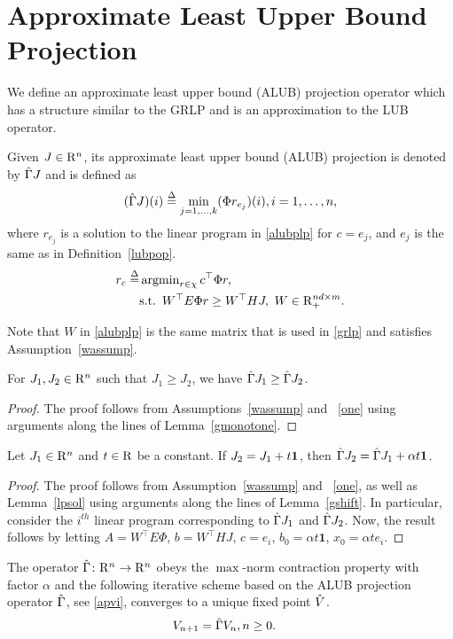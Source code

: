 \section{Approximate Least Upper Bound Projection}\label{sec:alubp}
We define an approximate least upper bound (ALUB) projection operator which has a structure similar to the GRLP and is an approximation to the LUB operator.
\begin{definition}\label{alubpop}
Given $J\in \mathrm{R}^n$, its approximate least upper bound (ALUB) projection is denoted by $\hat{\Gamma} J$ and is defined as 
\begin{align}\label{tgamdef}
(\hg J)(i)\stackrel{\Delta}{=}\underset{j=1,\ldots,k}{\min} (\Phi r_{e_j})(i), \mb i=1,\ldots,n,
\end{align}
where $r_{e_j}$ is a solution to the linear program in \eqref{alubplp} for $c=e_j$, and $e_j$ is the same as in Definition~\ref{lubpop}.
\begin{align}\label{alubplp}
r_c\stackrel{\Delta}{=} & \argmin_{r\in \chi} c^\top \Phi r,\nn\\
& \text{s.t.}\,\,\, W^\top E \Phi r\geq W^\top HJ,\,\, W \in \R^{nd\times m}_+ .
\end{align}
\end{definition}
Note that $W$ in \eqref{alubplp} is the same matrix that is used in \eqref{grlp} and satisfies Assumption~\ref{wassump}.
\begin{lemma}\label{tgmonotone}
For $J_1, J_2\in \mathrm{R}^n$ such that $J_1\geq J_2$, we have $\hat{\Gamma} J_1\geq \hat{\Gamma} J_2$.
\end{lemma}
\begin{proof}
The proof follows from Assumptions~\ref{wassump} and ~\ref{one} using arguments along the lines of Lemma~\ref{gmonotone}.
\end{proof}
\begin{lemma}\label{tgshift}
Let $J_1\in \mathrm{R}^n$ and $t\in \mathrm{R}$ be a constant. If $J_2=J_1+t\mathbf{1}$, then $\hat{\Gamma} J_2=\hat{\Gamma} J_1+\alpha t\mathbf{1}$.
\end{lemma}
\begin{proof}
The proof follows from Assumption~\ref{wassump} and ~\ref{one}, as well as Lemma~\ref{lpsol} using arguments along the lines of Lemma~\ref{gshift}. In particular, consider the $i^{th}$ linear program corresponding to $\hat{\Gamma} J_1$ and $\hat{\Gamma} J_2$. Now, the result follows by letting $A=W^\top E \Phi$, $b=W^\top H J$, $c=e_i$, $b_0=\alpha t \mathbf{1}$, $x_0=\alpha t e_i$.
\end{proof}
\begin{theorem}\label{tgmaxcontra}
The operator $\hat{\Gamma} \colon \mathrm{R}^n\rightarrow \mathrm{R}^n$ obeys the $\max$-norm contraction property with factor $\alpha$ and the following iterative scheme based on the ALUB projection operator $\hat{\Gamma}$, see \eqref{apvi}, converges to a unique fixed point $\hat{V}$.
\begin{align}\label{apvi}
V_{n+1}&=\hg V_n,\mb n\geq 0.
\end{align}
\end{theorem}
